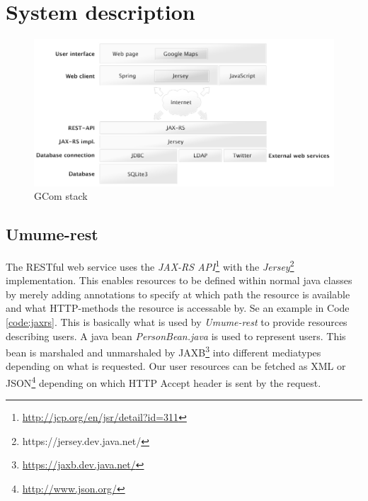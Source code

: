 \documentclass[titlepage, twocolumn, a4paper, 10pt]{article}
\begin{document}
\newpage
\section{System description}\label{sec:system}


\begin{figure}[!thb]
  \centerline{\includegraphics[width=160mm]{images/systemarchitecture.jpg}}
  \caption{GCom stack}
  \label{fig:images/sysarch}
\end{figure}

\subsection{Umume-rest}\label{sec:umume-rest}
The RESTful web service uses the \textit{JAX-RS API}\footnote{\url{http://jcp.org/en/jsr/detail?id=311}} with the \textit{Jersey}\footnote{https://jersey.dev.java.net/} implementation. This enables resources to be defined within normal java classes by merely adding annotations to specify at which path the resource is available and what HTTP-methods the resource is accessable by. Se an example in Code \ref{code:jaxrs}. This is basically what is used by \textit{Umume-rest} to provide resources describing users. A java bean \textit{PersonBean.java} is used to represent users. This bean is marshaled and unmarshaled by JAXB\footnote{\url{https://jaxb.dev.java.net/}} into different mediatypes depending on what is requested. Our user resources can be fetched as XML or JSON\footnote{\url{http://www.json.org/}} depending on which HTTP Accept header is sent by the request.
\end{document}
